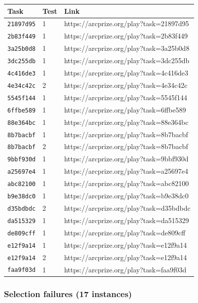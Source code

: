 \documentclass[11pt]{article}
\begin{document}
\begin{longtable}[]{@{}lll@{}}
\toprule\noalign{}
Task & Test & Link \\
\midrule\noalign{}
\endhead
\bottomrule\noalign{}
\endlastfoot
\texttt{21897d95} & 1 & https://arcprize.org/play?task=21897d95 \\
\texttt{2b83f449} & 1 & https://arcprize.org/play?task=2b83f449 \\
\texttt{3a25b0d8} & 1 & https://arcprize.org/play?task=3a25b0d8 \\
\texttt{3dc255db} & 1 & https://arcprize.org/play?task=3dc255db \\
\texttt{4c416de3} & 1 & https://arcprize.org/play?task=4c416de3 \\
\texttt{4e34c42c} & 2 & https://arcprize.org/play?task=4e34c42c \\
\texttt{5545f144} & 1 & https://arcprize.org/play?task=5545f144 \\
\texttt{6ffbe589} & 1 & https://arcprize.org/play?task=6ffbe589 \\
\texttt{88e364bc} & 1 & https://arcprize.org/play?task=88e364bc \\
\texttt{8b7bacbf} & 1 & https://arcprize.org/play?task=8b7bacbf \\
\texttt{8b7bacbf} & 2 & https://arcprize.org/play?task=8b7bacbf \\
\texttt{9bbf930d} & 1 & https://arcprize.org/play?task=9bbf930d \\
\texttt{a25697e4} & 1 & https://arcprize.org/play?task=a25697e4 \\
\texttt{abc82100} & 1 & https://arcprize.org/play?task=abc82100 \\
\texttt{b9e38dc0} & 1 & https://arcprize.org/play?task=b9e38dc0 \\
\texttt{d35bdbdc} & 2 & https://arcprize.org/play?task=d35bdbdc \\
\texttt{da515329} & 1 & https://arcprize.org/play?task=da515329 \\
\texttt{de809cff} & 1 & https://arcprize.org/play?task=de809cff \\
\texttt{e12f9a14} & 1 & https://arcprize.org/play?task=e12f9a14 \\
\texttt{e12f9a14} & 2 & https://arcprize.org/play?task=e12f9a14 \\
\texttt{faa9f03d} & 1 & https://arcprize.org/play?task=faa9f03d \\
\end{longtable}

\hypertarget{selection-failures-17-instances}{%
\subsubsection{Selection failures (17
instances)}\label{selection-failures-17-instances}}
\end{document}

